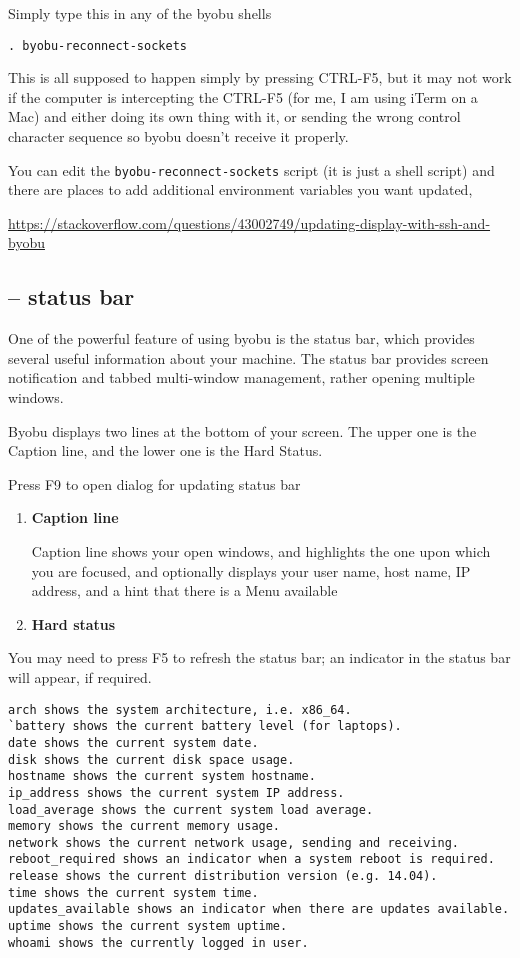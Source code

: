 Simply type this in any of the byobu shells
\begin{verbatim}
. byobu-reconnect-sockets
\end{verbatim}
This is all supposed to happen simply by pressing CTRL-F5, but it may
not work if the computer is intercepting the CTRL-F5 (for me, I am using iTerm
on a Mac) and either doing its own thing with it, or sending the wrong control
character sequence so byobu doesn't receive it properly.   

You can edit the \verb!byobu-reconnect-sockets! script (it is just a shell script) and
there are places to add additional environment variables you want updated, 

\url{https://stackoverflow.com/questions/43002749/updating-display-with-ssh-and-byobu}

\subsection{-- status bar}
\label{sec:byobu-status-bar}

One of the powerful feature of using byobu is the status bar, which provides
several useful information about your machine. The status bar provides screen
notification and tabbed multi-window management, rather opening multiple
windows.

Byobu displays two lines at the bottom of your screen. The upper one is the
Caption line, and the lower one is the Hard Status.

Press F9 to open dialog for updating status bar
\begin{enumerate}
  \item {\bf Caption line}
  
  Caption line shows your open windows, and highlights the one upon which you
  are focused, and optionally displays your user name, host name, IP address,
  and a hint that there is a Menu available
  
  \item {\bf Hard status}
\end{enumerate}
You may need to press F5 to refresh the status bar; an indicator in the status bar will appear, if required.



\begin{verbatim}
arch shows the system architecture, i.e. x86_64.
`battery shows the current battery level (for laptops).
date shows the current system date.
disk shows the current disk space usage.
hostname shows the current system hostname.
ip_address shows the current system IP address.
load_average shows the current system load average.
memory shows the current memory usage.
network shows the current network usage, sending and receiving.
reboot_required shows an indicator when a system reboot is required.
release shows the current distribution version (e.g. 14.04).
time shows the current system time.
updates_available shows an indicator when there are updates available.
uptime shows the current system uptime.
whoami shows the currently logged in user.
\end{verbatim}

